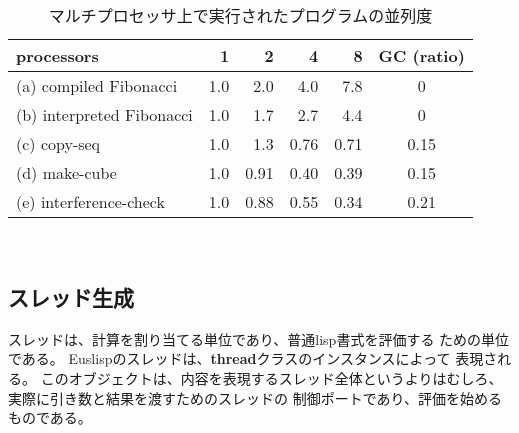 \begin{table}
\caption{\label{paragain}マルチプロセッサ上で実行されたプログラムの並列度}
\begin{center}
\begin{tabular}{|l|r|r|r|r|c|}  \hline
processors & 1 & 2 & 4 & 8 & GC (ratio) \\ \hline
(a) compiled Fibonacci & 1.0 & 2.0 & 4.0 & 7.8 & 0 \\ \hline
(b) interpreted Fibonacci & 1.0 & 1.7 & 2.7 & 4.4 & 0 \\ \hline
(c) copy-seq & 1.0 & 1.3 & 0.76 & 0.71 & 0.15 \\ \hline
(d) make-cube & 1.0 & 0.91 & 0.40 & 0.39 &  0.15 \\ \hline
(e) interference-check & 1.0 & 0.88 & 0.55 & 0.34 & 0.21 \\ \hline
\end{tabular} \\
\end{center}
\end{table}

\subsection{スレッド生成}
スレッドは、計算を割り当てる単位であり、普通lisp書式を評価する
ための単位である。
Euslispのスレッドは、{\bf thread}クラスのインスタンスによって
表現される。
このオブジェクトは、内容を表現するスレッド全体というよりはむしろ、
実際に引き数と結果を渡すためのスレッドの
制御ポートであり、評価を始めるものである。

